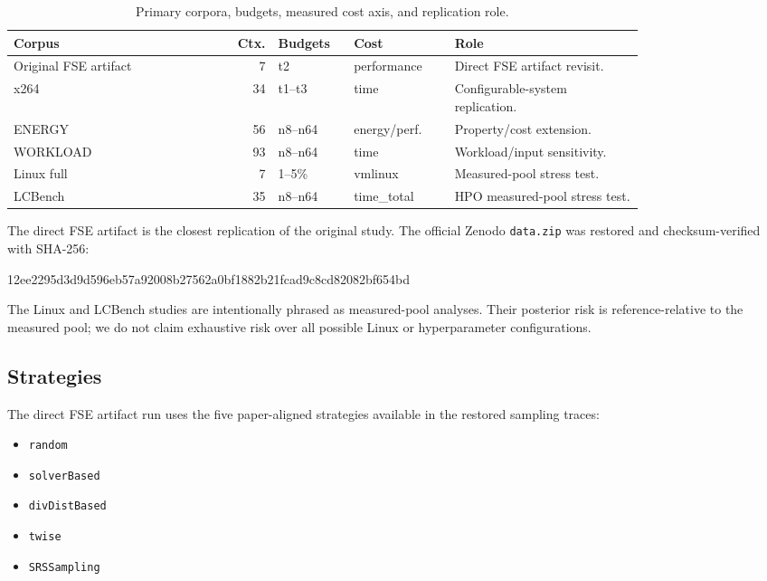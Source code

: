 \documentclass[smallcondensed]{svjour3}
\newenvironment{Shaded}{}{}
\newcommand{\NormalTok}[1]{#1}
\providecommand{\tightlist}{%
  \setlength{\itemsep}{0pt}\setlength{\parskip}{0pt}}
\begin{document}
\begin{table}[H]
\caption{Primary corpora, budgets, measured cost axis, and replication role.}
\label{tab:corpora}
\centering
\scriptsize
\begin{tabular}{@{}p{0.23\linewidth}r p{0.12\linewidth}p{0.16\linewidth}p{0.30\linewidth}@{}}
\toprule
Corpus & Ctx. & Budgets & Cost & Role \\
\midrule
Original FSE artifact & 7 & t2 & performance & Direct FSE artifact revisit. \\
x264 & 34 & t1--t3 & time & Configurable-system replication. \\
ENERGY & 56 & n8--n64 & energy/perf. & Property/cost extension. \\
WORKLOAD & 93 & n8--n64 & time & Workload/input sensitivity. \\
Linux full & 7 & 1--5\% & vmlinux & Measured-pool stress test. \\
LCBench & 35 & n8--n64 & time\_total & HPO measured-pool stress test. \\
\bottomrule
\end{tabular}
\end{table}

The direct FSE artifact is the closest replication of the original
study. The official Zenodo \texttt{data.zip} was restored and
checksum-verified with SHA-256:

\begin{Shaded}
\begin{Highlighting}[]
\NormalTok{12ee2295d3d9d596eb57a92008b27562a0bf1882b21fcad9c8cd82082bf654bd}
\end{Highlighting}
\end{Shaded}

The Linux and LCBench studies are intentionally phrased as measured-pool
analyses. Their posterior risk is reference-relative to the measured
pool; we do not claim exhaustive risk over all possible Linux or
hyperparameter configurations.

\subsection{Strategies}\label{strategies}

The direct FSE artifact run uses the five paper-aligned strategies
available in the restored sampling traces:

\begin{itemize}
\tightlist
\item
  \texttt{random}
\item
  \texttt{solverBased}
\item
  \texttt{divDistBased}
\item
  \texttt{twise}
\item
  \texttt{SRSSampling}
\end{itemize}
\end{document}
